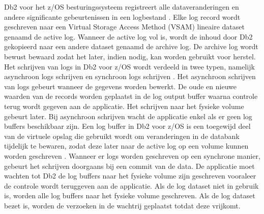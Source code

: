 Db2 voor het z/OS besturingssysteem registreert alle dataveranderingen en andere significante gebeurtenissen in een logbestand \autocite{ibm_2021_zos_db2_logs}.
Elke log record wordt geschreven naar een Virtual Storage Access Method (VSAM) lineaire dataset genaamd de active log. Wanneer de active log vol is, wordt de inhoud door Db2 gekopieerd naar een andere dataset genaamd de archive log.
De archive log wordt bewust bewaard zodat het later, indien nodig, kan worden gebruikt voor herstel.
Het schrijven van logs in Db2 voor z/OS wordt verdeeld in twee typen, namelijk asynchroon logs schrijven en synchroon logs schrijven \autocite{ibm_2026_db2_log_writes}.
Het asynchroon schrijven van logs gebeurt wanneer de gegevens worden bewerkt. 
De oude en nieuwe waarden van de records worden geplaatst in de log output buffer waarna controle terug wordt gegeven aan de applicatie. 
Het schrijven naar het fysieke volume gebeurt later. 
Bij asynchroon schrijven wacht de applicatie enkel als er geen log buffers beschikbaar zijn.
Een log buffer in Db2 voor z/OS is een toegewijd deel van de virtuele opslag die gebruikt wordt om veranderingen in de databank tijdelijk te bewaren, zodat deze later naar de active log op een volume kunnen worden geschreven \autocite{ibm_2026_db2_improving_log_write_log_buffers}.
Wanneer er logs worden geschreven op een synchrone manier, gebeurt het schrijven doorgaans bij een commit van de data. 
De applicatie moet wachten tot Db2 de log buffers naar het fysieke volume zijn geschreven vooraleer de controle wordt teruggeven aan de applicatie.
Als de log dataset niet in gebruik is, worden alle log buffers naar het fysieke volume geschreven.
Als de log dataset bezet is, worden de verzoeken in de wachtrij geplaatst totdat deze vrijkomt.

